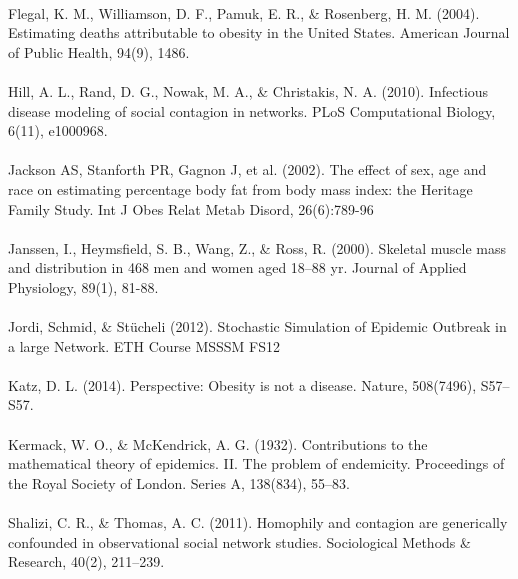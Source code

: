 \documentclass[11pt]{article}
\begin{document}
\paragraph{}
Flegal, K. M., Williamson, D. F., Pamuk, E. R., \& Rosenberg, H. M. (2004). Estimating deaths attributable to obesity in the United States. American Journal of Public Health, 94(9), 1486.
\paragraph{}
Hill, A. L., Rand, D. G., Nowak, M. A., \& Christakis, N. A. (2010). Infectious disease modeling of social contagion in networks. PLoS Computational Biology, 6(11), e1000968.
\paragraph{}
Jackson AS, Stanforth PR, Gagnon J, et al. (2002). The effect of sex, age and race on estimating percentage body fat from body mass index: the Heritage Family Study. Int J Obes Relat Metab Disord, 26(6):789-96
\paragraph{}
Janssen, I., Heymsfield, S. B., Wang, Z., & Ross, R. (2000). Skeletal muscle mass and distribution in 468 men and women aged 18–88 yr. Journal of Applied Physiology, 89(1), 81-88.
 \paragraph{}
Jordi, Schmid, \& Stücheli (2012). Stochastic Simulation of Epidemic Outbreak in a large Network. ETH Course MSSSM FS12
\paragraph{}
Katz, D. L. (2014). Perspective: Obesity is not a disease. Nature, 508(7496), S57–S57. 
\paragraph{}
Kermack, W. O., \& McKendrick, A. G. (1932). Contributions to the mathematical theory of epidemics. II. The problem of endemicity. Proceedings of the Royal Society of London. Series A, 138(834), 55–83.
\paragraph{}
Shalizi, C. R., \& Thomas, A. C. (2011). Homophily and contagion are generically confounded in observational social network studies. Sociological Methods & Research, 40(2), 211–239.
\end{document}
